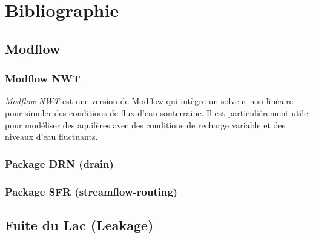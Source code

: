 
\chapter{Bibliographie}
\label{chap:bibliographie}

\minitableofcontents

\newpage


\section{Modflow}
\label{sec:modflow}

\subsection{Modflow NWT}
\label{sec:modflow_nwt}

\textit{Modflow NWT} est une version de Modflow qui intègre un solveur non linéaire pour simuler des conditions de flux d'eau souterraine. Il est particulièrement utile pour modéliser des aquifères avec des conditions de recharge variable et des niveaux d'eau fluctuants.

\subsection{Package DRN (drain)}
\label{sec:package_drn}

\subsection{Package SFR (streamflow-routing)}
\label{sec:package_sfr}

\section{Fuite du Lac (Leakage)}
\label{sec:Leakage}

